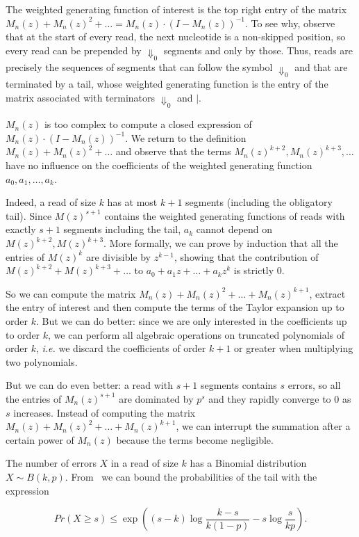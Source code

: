 \documentclass{article}
\begin{document}
The weighted generating function of interest is the top right entry of the
matrix $M_n(z) + M_n(z)^2 + \ldots = M_n(z)\cdot(I-M_n(z))^{-1}$. To see
why, observe that at the start of every read, the next nucleotide is a
non-skipped position, so every read can be prepended by $\Downarrow_0$
segments and only by those. Thus, reads are precisely the sequences of
segments that can follow the symbol $\Downarrow_0$ and that are terminated
by a tail, whose weighted generating function is the entry of the matrix
associated with terminators $\Downarrow_0$ and $|$.

$M_n(z)$ is too complex to compute a closed expression of $M_n(z) \cdot
(I-M_n(z))^{-1}$. We return to the definition $M_n(z) + M_n(z)^2 + \ldots$
and observe that the terms $M_n(z)^{k+2}, M_n(z)^{k+3}, \ldots$ have no
influence on the coefficients of the weighted generating function $a_0,
a_1, \ldots, a_k$.

Indeed, a read of size $k$ has at most $k+1$ segments (including the
obligatory tail). Since $M(z)^{s+1}$ contains the weighted generating
functions of reads with exactly $s+1$ segments including the tail, $a_k$
cannot depend on $M(z)^{k+2}, M(z)^{k+3}$. More formally, we can prove by
induction that all the entries of $M(z)^k$ are divisible by $z^{k-1}$,
showing that the contribution of $M(z)^{k+2} + M(z)^{k+3} + \ldots$ to
$a_0 + a_1z + \ldots +a_kz^k$ is strictly $0$.

So we can compute the matrix $M_n(z) + M_n(z)^2 + \ldots + M_n(z)^{k+1}$,
extract the entry of interest and then compute the terms of the Taylor
expansion up to order $k$. But we can do better: since we are only
interested in the coefficients up to order $k$, we can perform all
algebraic operations on truncated polynomials of order $k$, \textit{i.e.}
we discard the coefficients of order $k+1$ or greater when multiplying two
polynomials.

But we can do even better: a read with $s+1$ segments contains $s$ errors,
so all the entries of $M_n(z)^{s+1}$ are dominated by $p^s$ and they
rapidly converge to $0$ as $s$ increases. Instead of computing the matrix
$M_n(z) + M_n(z)^2 + \ldots + M_n(z)^{k+1}$, we can interrupt the
summation after a certain power of $M_n(z)$ because the terms become
negligible.

The number of errors $X$ in a read of size $k$ has a Binomial
distribution $X \sim B(k,p)$. From~\cite{arratia1989tutorial} we can bound
the probabilities of the tail with the expression

\begin{equation}
\label{eq:bound}
Pr(X \geq s) \leq \exp \left( (s-k)\log \frac{k-s}{k(1-p)} -s\log
\frac{s}{kp} \right).
\end{equation}
\end{document}
